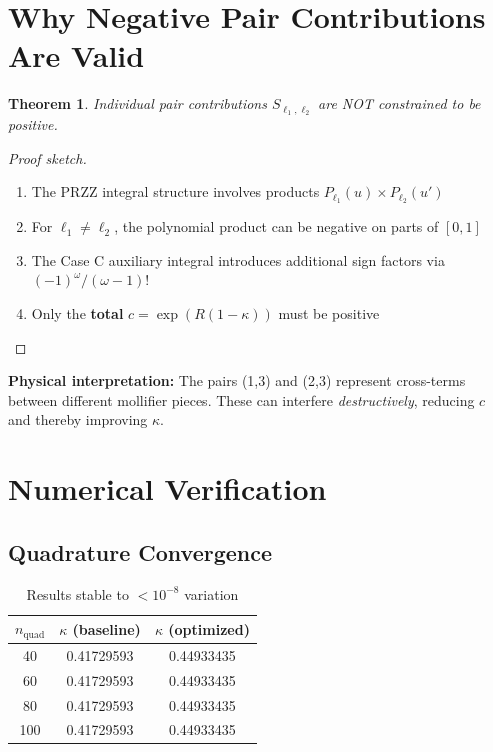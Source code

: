 \documentclass[11pt]{article}
\newtheorem{theorem}{Theorem}
\begin{document}
\section{Why Negative Pair Contributions Are Valid}

\begin{theorem}
Individual pair contributions $S_{\ell_1,\ell_2}$ are NOT constrained to be positive.
\end{theorem}

\begin{proof}[Proof sketch]
\begin{enumerate}
\item The PRZZ integral structure involves products $P_{\ell_1}(u) \times P_{\ell_2}(u')$
\item For $\ell_1 \neq \ell_2$, the polynomial product can be negative on parts of $[0,1]$
\item The Case C auxiliary integral introduces additional sign factors via $(-1)^\omega / (\omega-1)!$
\item Only the \textbf{total} $c = \exp(R(1-\kappa))$ must be positive
\end{enumerate}
\end{proof}

\textbf{Physical interpretation:} The pairs (1,3) and (2,3) represent cross-terms between different mollifier pieces. These can interfere \emph{destructively}, reducing $c$ and thereby improving $\kappa$.

\section{Numerical Verification}

\subsection{Quadrature Convergence}

\begin{table}[h]
\centering
\begin{tabular}{ccc}
\toprule
$n_{\text{quad}}$ & $\kappa$ (baseline) & $\kappa$ (optimized) \\
\midrule
40 & 0.41729593 & 0.44933435 \\
60 & 0.41729593 & 0.44933435 \\
80 & 0.41729593 & 0.44933435 \\
100 & 0.41729593 & 0.44933435 \\
\bottomrule
\end{tabular}
\caption{Results stable to $< 10^{-8}$ variation}
\end{table}
\end{document}
